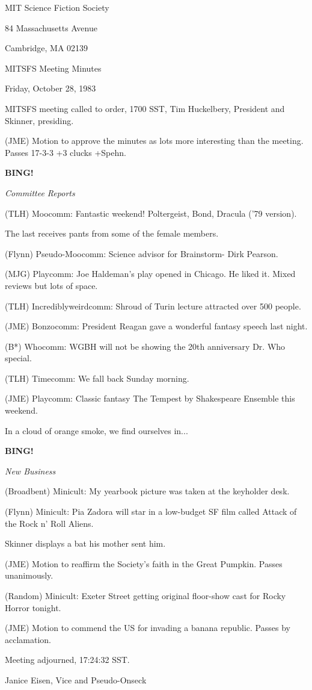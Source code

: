 \documentclass[12pt]{article}
\newcommand{\bing}{{\bf BING!} }
\newcommand{\goto}[1]{\bing \vskip 12pt \centerline{{\em{#1}}}}
\begin{document}
\begin{center}

MIT Science Fiction Society 

84 Massachusetts Avenue

Cambridge, MA 02139

\vspace{12pt}

MITSFS Meeting Minutes 

Friday, October 28, 1983

\end{center}
 
\vspace{18pt}

\setlength{\parskip}{6pt}

\noindent
MITSFS meeting called to order, 1700 SST,
Tim Huckelbery, President and Skinner, presiding.

(JME) Motion to approve the minutes as lots more interesting than the meeting. Passes 17-3-3 +3 clucks +Spehn.

\goto{Committee Reports}

(TLH) Moocomm: Fantastic weekend! Poltergeist, Bond, Dracula ('79 version).

The last receives pants from some of the female members.

(Flynn) Pseudo-Moocomm: Science advisor for Brainstorm- Dirk Pearson.

(MJG) Playcomm: Joe Haldeman's play opened in Chicago. He liked it. Mixed reviews but lots of space.

(TLH) Incrediblyweirdcomm: Shroud of Turin lecture attracted over 500 people.

(JME) Bonzocomm: President Reagan gave a wonderful fantasy speech last night.

(B*) Whocomm: WGBH will not be showing the 20th anniversary Dr. Who special.

(TLH) Timecomm: We fall back Sunday morning.

(JME) Playcomm: Classic fantasy The Tempest by Shakespeare Ensemble this weekend.

In a cloud of orange smoke, we find ourselves in...

\goto{New Business}

(Broadbent) Minicult: My yearbook picture was taken at the keyholder desk.

(Flynn) Minicult: Pia Zadora will star in a low-budget SF film called Attack of the Rock n' Roll Aliens.

Skinner displays a bat his mother sent him.

(JME) Motion to reaffirm the Society's faith in the Great Pumpkin. Passes unanimously.

(Random) Minicult: Exeter Street getting original floor-show cast for Rocky Horror tonight.

(JME) Motion to commend the US for invading a banana republic. Passes by acclamation.

\vspace{12pt}

\noindent
Meeting adjourned, 17:24:32 SST.

\vspace{18pt}

\centerline{Janice Eisen, Vice and Pseudo-Onseck}
\end{document}
